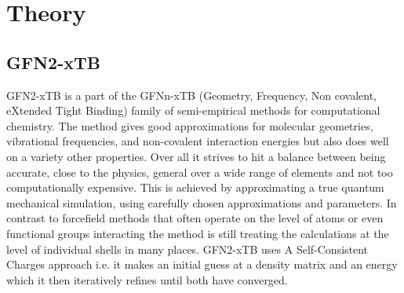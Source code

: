 \section{Theory}
\subsection{GFN2-xTB}
GFN2-xTB is a part of the GFNn-xTB (Geometry, Frequency, Non covalent, eXtended Tight Binding) family of semi-empirical methods for computational chemistry. 
The method gives good approximations for molecular geometries, vibrational frequencies, and non-covalent interaction energies but also does well on a variety other properties. 
Over all it strives to hit a balance between being accurate, close to the physics, general over a wide range of elements and not too computationally expensive.
This is achieved by approximating a true quantum mechanical simulation, using carefully chosen approximations and parameters. 
In contrast to forcefield methods that often operate on the level of atoms or even functional groups interacting the method is still treating the calculations at the level of individual shells in many places. 
GFN2-xTB uses A Self-Consistent Charges approach i.e. it makes an initial guess at a density matrix and an energy which it then iteratively refines until both have converged. 

